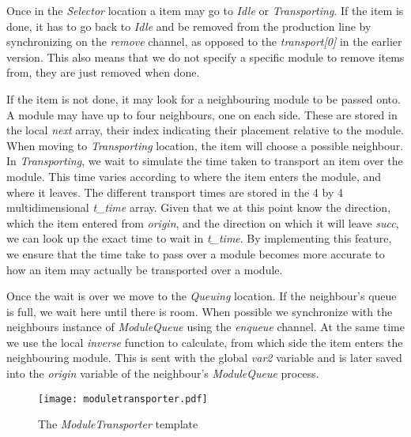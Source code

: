 Once in the \emph{Selector} location a item may go to \emph{Idle} or \emph{Transporting}. If the item is done, it has to go back to \textit{Idle} and be removed from the production line by synchronizing on the \emph{remove} channel, as opposed to the \emph{transport[0]} in the earlier version. This also means that we do not specify a specific module to remove items from, they are just removed when done.

If the item is not done, it may look for a neighbouring module to be passed onto. A module may have up to four neighbours, one on each side. These are stored in the local \emph{next} array, their index indicating their placement relative to the module. When moving to \emph{Transporting} location, the item will choose a possible neighbour. In \emph{Transporting}, we wait to simulate the time taken to transport an item over the module. This time varies according to where the item enters the module, and where it leaves. The different transport times are stored in the 4 by 4 multidimensional \emph{t\_time} array. Given that we at this point know the direction, which the item entered from \emph{origin}, and the direction on which it will leave \emph{succ}, we can look up the exact time to wait in \emph{t\_time}. By implementing this feature, we ensure that the time take to pass over a module becomes more accurate to how an item may actually be transported over a module. 

Once the wait is over we move to the \emph{Queuing} location. If the neighbour's queue is full, we wait here until there is room. When possible we synchronize with the neighbours instance of \emph{ModuleQueue} using the \emph{enqueue} channel. At the same time we use the local \emph{inverse} function to calculate, from which side the item enters the neighbouring module. This is sent with the global \emph{var2} variable and is later saved into the  \emph{origin} variable of the neighbour's \textit{ModuleQueue} process. 

\begin{figure}[H]
\centering
\texttt{[image: moduletransporter.pdf]}
\caption{The \textit{ModuleTransporter} template}
\label{fig:moduletransporter}
\end{figure}


